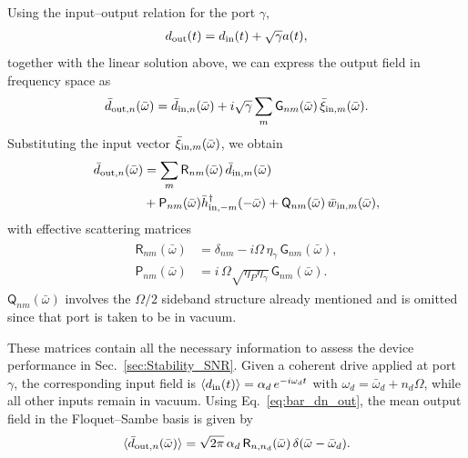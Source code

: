 \documentclass[a4paper,twocolumn,floatfix,10pt,superscriptaddress]%
{quantumarticle}
\newcommand{\aprc}[1]{{\color{aprcolor}{[APR: #1]}}}
\newcommand{\msf}[1]{\mathsf{#1}}
\newcommand{\bomega}{{\bar{\omega}}}
\newcommand{\msG}{{\msf{G}}}
\newcommand{\rmout}{{{\rm out}}}
\newcommand{\rmin}{{{\rm in}}}
\begin{document}
Using the input–output relation for the \aprc{statically-coupled dissipative} port $\gamma$, \begin{align}
    d_{\rmout}(t)=d_{\rmin}(t)+\sqrt{\gamma} a(t),
\end{align} together with the linear solution above, we can express the output field in frequency space as 
\begin{align}
    \bar{d}_{\rmout,n}(\bomega) 
= \bar{d}_{\rmin,n}(\bomega) 
+ i \sqrt{\gamma} \sum_m \msf{G}_{n m}(\bomega)\, \bar{\xi}_{\rmin,m}(\bomega).\nonumber
\end{align}
Substituting the input vector $\bar{\xi}_{\rmin,m}(\bomega)$, we obtain
\begin{align}
\bar{d}_{\rmout,n}(\bomega) 
&= \sum_m \msf{R}_{n m}(\bomega)\, \bar{d}_{\rmin,m}(\bomega)\label{eq:bar_dn_out}
\\&+\msf{P}_{nm}(\bomega) \bar{h}_{\rmin,-m}^\dag(-\bomega)+ \msf{Q}_{n m}(\bomega)\, \bar{w}_{\rmin,m}(\bomega),\nonumber
\end{align}
with effective scattering matrices
\begin{align}\label{eqs:R_nm_P_nm}
\begin{aligned}
    \msf{R}_{n m}(\bar\omega) &= \delta_{n m} - i \Omega\,\eta_{\gamma}\,\msG_{n m}(\bar\omega),\\
\msf{P}_{n m}(\bar\omega) &= i\,\Omega\sqrt{\eta_{P}\eta_{\gamma}}\,\msf{G}_{n m}(\bar\omega).
\end{aligned}
\end{align}
$\msf{Q}_{n m}(\bomega)$ involves the $\Omega/2$ sideband structure already mentioned and is omitted since that port is taken to be in vacuum.

These matrices contain all the necessary information to  assess the device performance in Sec.~\ref{sec:Stability_SNR}. Given a coherent drive applied at port $\gamma$, the corresponding input field is $\langle d_{\rm in}(t) \rangle = \alpha_d\, e^{-i\omega_d t}$ with $\omega_d = \bar{\omega}_d + n_d \Omega$, while all other inputs remain in vacuum. Using Eq.~\eqref{eq:bar_dn_out}, the mean output field in the Floquet--Sambe basis is given by 
\begin{eqnarray}
    \langle \bar{d}_{{\rm out}, n}(\bar{\omega}) \rangle = \sqrt{2\pi}\, \alpha_d\, \mathsf{R}_{n,n_d}(\bar{\omega})\, \delta(\bar{\omega}-\bar{\omega}_d).
\end{eqnarray}
\end{document}
